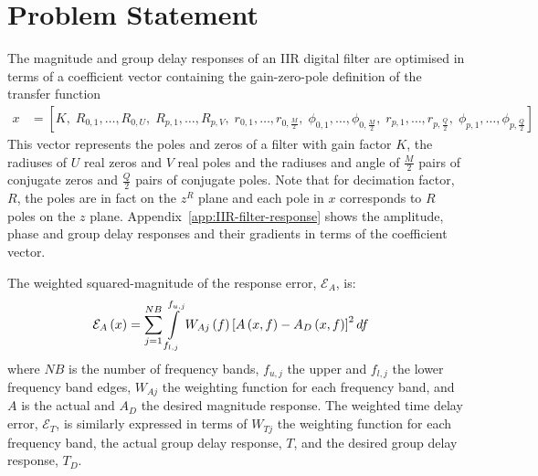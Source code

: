 \documentclass[a4paper,twoside,10pt,english]{report}
\begin{document}
\section{Problem Statement }
The magnitude and group delay responses of an IIR digital 
filter are optimised in terms of a coefficient vector containing the
gain-zero-pole definition of the transfer function
\begin{align}
x &= \left[
   K         , 
\; R_{0,1}    , \ldots , R_{0,U}            , 
\; R_{p,1}    , \ldots , R_{p,V}            , 
\; r_{0,1}    , \ldots , r_{0,\frac{M}{2}}    , 
\; \phi_{0,1} , \ldots , \phi_{0,\frac{M}{2}} , 
\; r_{p,1}    , \ldots , r_{p,\frac{Q}{2}}    , 
\; \phi_{p,1} , \ldots , \phi_{p,\frac{Q}{2}}
\right]\label{eqn:Filter-gain-zeros-poles}
\end{align}
This vector represents the poles and zeros of a filter with gain factor $K$,
the radiuses of $U$ real zeros and $V$ real poles and the radiuses and angle of
$\frac{M}{2}$ pairs of conjugate zeros and $\frac{Q}{2}$ pairs of conjugate
poles. Note that for decimation factor, $R$, the poles are in fact on the
$z^{R}$ plane and each pole in $x$ corresponds to $R$ poles on the $z$ plane.
Appendix~\ref{app:IIR-filter-response} shows the amplitude, phase and
group delay responses and their gradients in terms of the coefficient vector.

The weighted squared-magnitude of the response error, $\mathcal{E}_{A}$, is:
\begin{align*}
\mathcal{E}_{A}\left(x\right) &= 
\sum_{j=1}^{NB}\intop_{f_{l,j}}^{f_{u,j}}W_{Aj}\left(f\right)\left[A\left(x,f\right)-
A_{D}\left(x,f\right)\right]^{2}df
\end{align*}
where $NB$ is the number of frequency bands, $f_{u,j}$ the upper
and $f_{l,j}$ the lower frequency band edges, $W_{Aj}$ the weighting
function for each frequency band, and $A$ is the actual and $A_{D}$ the desired
magnitude response. 
The weighted time delay error, $\mathcal{E}_{T}$, is similarly expressed in
terms of  $W_{Tj}$ the weighting function for each frequency band, the
actual group delay response, $T$, and the desired group delay response, $T_{D}$.
\end{document}
